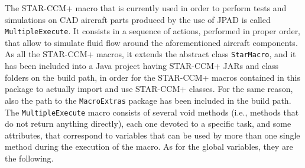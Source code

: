 \bigskip
\noindent
The STAR-CCM+ macro that is currently used in order to perform tests and simulations on \gls{CAD} aircraft parts produced by the use of \gls{JPAD} is called \lstinline[language=Java]!MultipleExecute!. It consists in a sequence of actions, performed in proper order, that allow to simulate fluid flow around the aforementioned aircraft components. As all the STAR-CCM+ macros, it extends the abstract class \lstinline[language=Java]!StarMacro!, and it has been included into a Java project having STAR-CCM+ \gls{JAR}s and class folders on the build path, in order for the STAR-CCM+ macros contained in this package to actually import and use STAR-CCM+ classes. For the same reason, also the path to the \lstinline[language=Java]!MacroExtras! package has been included in the build path. The \lstinline[language=Java]!MultipleExecute! macro consists of several void methods (i.e., methods that do not return anything directly), each one devoted to a specific task, and some attributes, that correspond to variables that can be used by more than one single method during the execution of the macro. As for the global variables, they are the following.
%
